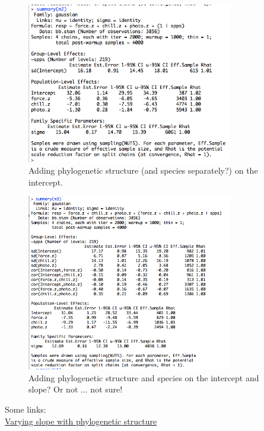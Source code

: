 \documentclass[11pt,letter]{article}
\begin{document}
\begin{figure}[h!]
\centering
\noindent \includegraphics[width=0.8\textwidth]{figures/brms_m2.png} 
\caption{Adding phylogenetic structure (and species separately?) on the intercept.}
\end{figure}

\begin{figure}[h!]
\centering
\noindent \includegraphics[width=0.8\textwidth]{figures/brms_m3.png} 
\caption{Adding phylogenetic structure and species on the intercept and slope? Or not ... not sure!}
\end{figure}

Some links:\\
\href{https://discourse.mc-stan.org/t/varying-slope-with-phylogenetic-structure/5739/4}{Varying slope with phylogenetic structure}\\
\href{https://discourse.mc-stan.org/t/multivariate-phylogenetic-with-repeated-measurements-model-help/14359/6}\\
\end{document}
